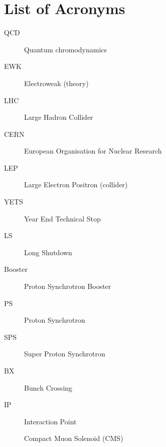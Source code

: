 \chapter{List of Acronyms}

  \begin{description}

    \item[QCD]		    \dotfill	Quantum chromodynamics
    \item[EWK]		    \dotfill	Electroweak (theory)

    \item[LHC]		    \dotfill	Large Hadron Collider
    \item[CERN]       \dotfill	European Organisation for Nuclear Research
    \item[LEP]        \dotfill  Large Electron Positron (collider)
    \item[YETS]       \dotfill  Year End Technical Stop
    \item[LS]         \dotfill  Long Shutdown
    \item[Booster]    \dotfill  Proton Synchrotron Booster
    \item[PS]         \dotfill  Proton Synchrotron
    \item[SPS]        \dotfill  Super Proton Synchrotron
    \item[BX]         \dotfill  Bunch Crossing
    \item[IP]         \dotfill  Interaction Point

    Compact Muon Solenoid (CMS)

  \end{description}
